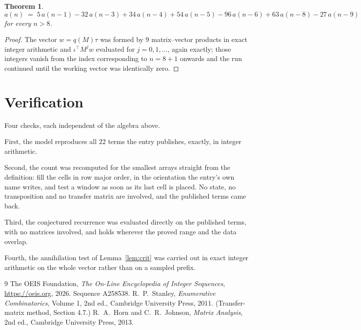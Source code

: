 \documentclass[11pt,a4paper]{article}
\theoremstyle{plain}
\newtheorem{theorem}{Theorem}
\theoremstyle{definition}
\begin{document}
\begin{theorem}
\[
a(n)\;=\;5\,a(n-1) - 32\,a(n-3) + 34\,a(n-4) + 54\,a(n-5) - 96\,a(n-6) + 63\,a(n-8) - 27\,a(n-9)
\]
for every $n>8$.
\end{theorem}

\begin{proof}
The vector $w=q(M)\tau$ was formed by $9$ matrix--vector products in exact integer
arithmetic and $\iota^{\!\top}M^{j}w$ evaluated for $j=0,1,\dots$, again exactly; those
integers vanish from the index corresponding to $n=8+1$ onwards and the run continued
until the working vector was identically zero.
\end{proof}

\section{Verification}

Four checks, each independent of the algebra above.

First, the model reproduces all $22$ terms the entry publishes, exactly, in integer
arithmetic.

Second, the count was recomputed for the smallest arrays straight from the definition: fill the
cells in row major order, in the orientation the entry's own name writes, and test a window as
soon as its last cell is placed. No state, no transposition and no transfer matrix are
involved, and the published terms came back.

Third, the conjectured recurrence was evaluated directly on the published terms, with no
matrices involved, and holds wherever the proved range and the data overlap.

Fourth, the annihilation test of Lemma~\ref{lem:crit} was carried out in exact integer
arithmetic on the whole vector rather than on a sampled prefix.

\begin{thebibliography}{9}
 The OEIS Foundation, \emph{The On-Line Encyclopedia of Integer
Sequences}, \url{https://oeis.org}, 2026. Sequence A258538.
 R.~P.~Stanley, \emph{Enumerative Combinatorics}, Volume 1, 2nd ed.,
Cambridge University Press, 2011. (Transfer-matrix method, Section 4.7.)
 R.~A.~Horn and C.~R.~Johnson, \emph{Matrix Analysis}, 2nd ed., Cambridge
University Press, 2013.
\end{thebibliography}
\end{document}
